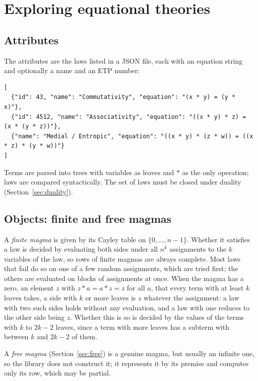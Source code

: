 \documentclass[11pt,a4paper]{article}
\theoremstyle{definition}
\theoremstyle{remark}
\begin{document}
\section{Exploring equational theories}\label{sec:et}

\subsection{Attributes}

The attributes are the laws listed in a JSON file, each with an equation string and optionally a name and an ETP number:
\begin{Verbatim}
[
  {"id": 43, "name": "Commutativity", "equation": "(x * y) = (y * x)"},
  {"id": 4512, "name": "Associativity", "equation": "((x * y) * z) = (x * (y * z))"},
  {"name": "Medial / Entropic", "equation": "((x * y) * (z * w)) = ((x * z) * (y * w))"}
]
\end{Verbatim}
Terms are parsed into trees with variables as leaves and $*$ as the only operation; laws are compared syntactically. The set of laws must be closed under duality (Section~\ref{sec:duality}).

\subsection{Objects: finite and free magmas}\label{sec:objects}

A \emph{finite magma} is given by its Cayley table on $\{0, \dots, n-1\}$. Whether it satisfies a law is decided by evaluating both sides under all $n^k$ assignments to the $k$ variables of the law, so rows of finite magmas are always complete. Most laws that fail do so on one of a few random assignments, which are tried first; the others are evaluated on blocks of assignments at once. When the magma has a zero, an element $z$ with $z * a = a * z = z$ for all $a$, that every term with at least $k$ leaves takes, a side with $k$ or more leaves is $z$ whatever the assignment: a law with two such sides holds without any evaluation, and a law with one reduces to the other side being $z$. Whether this is so is decided by the values of the terms with $k$ to $2k - 2$ leaves, since a term with more leaves has a subterm with between $k$ and $2k-2$ of them.

A \emph{free magma} (Section~\ref{sec:free}) is a genuine magma, but usually an infinite one, so the library does not construct it; it represents it by its premise and computes only its row, which may be partial.
\end{document}
